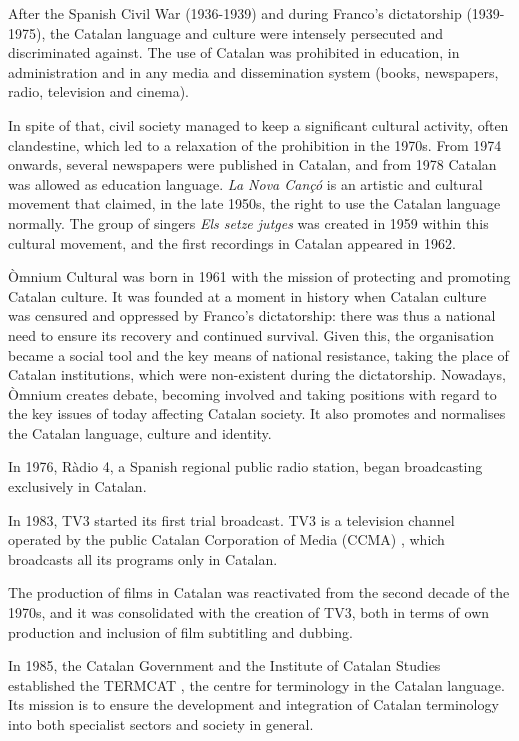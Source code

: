 \begin{multicols}{2}
After the Spanish Civil War (1936-1939) and during Franco’s dictatorship (1939-1975), the Catalan language and culture were intensely persecuted and discriminated against. The use of Catalan was prohibited in education, in administration and in any media and dissemination system (books, newspapers, radio, television and cinema).


In spite of that, civil society managed to keep a significant cultural activity, often clandestine, which led to a relaxation of the prohibition in the 1970s. From 1974 onwards, several newspapers were published in Catalan, and from 1978 Catalan was allowed as education language. \textit{La Nova Cançó} is an artistic and cultural movement that claimed, in the late 1950s, the right to use the Catalan language normally. The group of singers \textit{Els setze jutges} was created in 1959 within this cultural movement, and the first recordings in Catalan appeared in 1962.

Òmnium Cultural \cite{CAT-omniumcultural} was born in 1961 with the mission of protecting and promoting Catalan culture. It was founded at a moment in history when Catalan culture was censured and oppressed by Franco’s dictatorship: there was thus a national need to ensure its recovery and continued survival. Given this, the organisation became a social tool and the key means of national resistance, taking the place of Catalan institutions, which were non-existent during the dictatorship. Nowadays, Òmnium creates debate, becoming involved and taking positions with regard to the key issues of today affecting Catalan society. It also promotes and normalises the Catalan language, culture and identity.

In 1976, Ràdio 4, a Spanish regional public radio station, began broadcasting exclusively in Catalan.

In 1983, TV3 started its first trial broadcast. TV3 is a television channel operated by the public Catalan Corporation of Media (CCMA) \cite{CAT-CCMA}, which broadcasts all its programs only in Catalan.

The production of films in Catalan was reactivated from the second decade of the 1970s, and it was consolidated with the creation of TV3, both in terms of own production and inclusion of film subtitling and dubbing.

In 1985, the Catalan Government and the Institute of Catalan Studies established the TERMCAT \cite{CAT-TERMCAT}, the centre for terminology in the Catalan language. Its mission is to ensure the development and integration of Catalan terminology into both specialist sectors and society in general.


\end{multicols}
